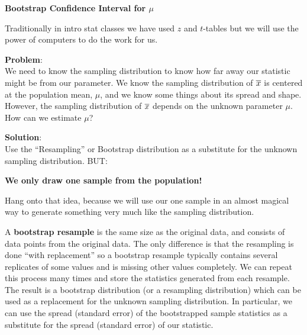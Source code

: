 \def\theTopic{Textbook Costs}
\def\dayNum{11 }


\begin{center}
{\bf {\large \textbf{Bootstrap  Confidence Interval for $\mu$}}}
\end{center}



Traditionally in intro stat classes we have used $z$ and $t$-tables 
but we will  use the power of computers to do the work for us. 

{\bf Problem}:\\
We need to know the sampling distribution to know how far away our
statistic might be from our parameter.  We know the sampling
distribution of $ \overline{x}$ is centered at the population mean, $\mu$, and
we know some things about its spread and shape.   However, the sampling
distribution  of $ \overline{x}$ depends on the unknown parameter $\mu$. How
can we estimate $\mu$? 


{\bf Solution}:\\Use the ``Resampling'' or Bootstrap distribution as a
substitute for the unknown sampling distribution. BUT:
\vspace{-.2in}
\begin{center}
	{\bf\sf	We only draw {\bf one} sample from the population!}
\end{center}

Hang onto that idea, because we will use our one sample  in an almost
magical way to generate something very much like the sampling
distribution.   


  A {\bf bootstrap resample} is the same size as the original data, and
  consists of data points from the original data.  The only difference
  is that the resampling is done ``with replacement'' so a bootstrap
  resample typically contains several replicates of some values and is
  missing other values completely.  We can repeat this process many
  times and store the statistics generated from each resample.  The
  result is a bootstrap distribution (or a resampling distribution)
  which can be used as a replacement for the unknown sampling
  distribution.  In particular, we can use the spread (standard error)
  of the bootstrapped sample statistics as a substitute for the spread
  (standard error) of our statistic.  

